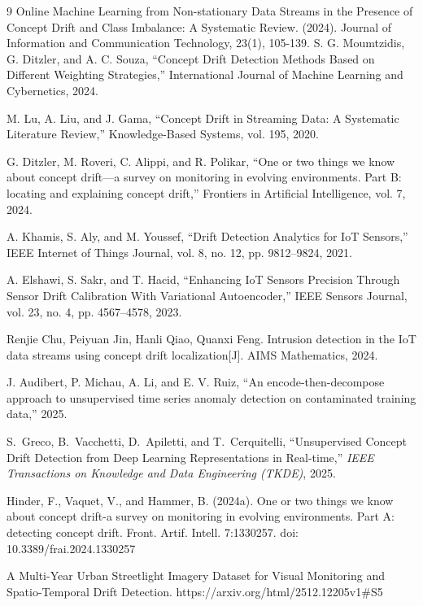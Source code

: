 \documentclass[journal]{IEEEtran} %
\begin{document}
\begin{thebibliography}{9}
Online Machine Learning from Non-stationary Data Streams in the Presence of Concept Drift and Class Imbalance: A Systematic Review. (2024). Journal of Information and Communication Technology, 23(1), 105-139.
S. G. Moumtzidis, G. Ditzler, and A. C. Souza, “Concept Drift Detection Methods Based on Different Weighting Strategies,” International Journal of Machine Learning and Cybernetics, 2024.

M. Lu, A. Liu, and J. Gama, “Concept Drift in Streaming Data: A Systematic Literature Review,” Knowledge-Based Systems, vol. 195, 2020.

G. Ditzler, M. Roveri, C. Alippi, and R. Polikar, “One or two things we know about concept drift—a survey on monitoring in evolving environments. Part B: locating and explaining concept drift,” 
Frontiers in Artificial Intelligence, vol. 7, 2024.

A. Khamis, S. Aly, and M. Youssef, “Drift Detection Analytics for IoT Sensors,” IEEE Internet of Things Journal, vol. 8, no. 12, pp. 9812–9824, 2021.

A. Elshawi, S. Sakr, and T. Hacid, “Enhancing IoT Sensors Precision Through Sensor Drift Calibration With Variational Autoencoder,” IEEE Sensors Journal, vol. 23, no. 4, pp. 4567–4578, 2023.

Renjie Chu, Peiyuan Jin, Hanli Qiao, Quanxi Feng. Intrusion detection in the IoT data streams using concept drift localization[J]. AIMS Mathematics, 2024.

J. Audibert, P. Michau, A. Li, and E. V. Ruiz, 
“An encode-then-decompose approach to unsupervised time series anomaly detection on contaminated training data,” 2025.

S.~Greco, B.~Vacchetti, D.~Apiletti, and T.~Cerquitelli, ``Unsupervised Concept Drift Detection from Deep Learning Representations in Real-time,'' \textit{IEEE Transactions on Knowledge and Data Engineering (TKDE)}, 2025.

Hinder, F., Vaquet, V., and Hammer, B. (2024a). One or two things we know about concept drift-a survey on monitoring in evolving environments. Part A: detecting concept drift. Front. Artif. Intell. 7:1330257. doi: 10.3389/frai.2024.1330257

A Multi-Year Urban Streetlight Imagery Dataset for Visual Monitoring and Spatio-Temporal Drift Detection. https://arxiv.org/html/2512.12205v1#S5


\end{thebibliography}
\end{document}
